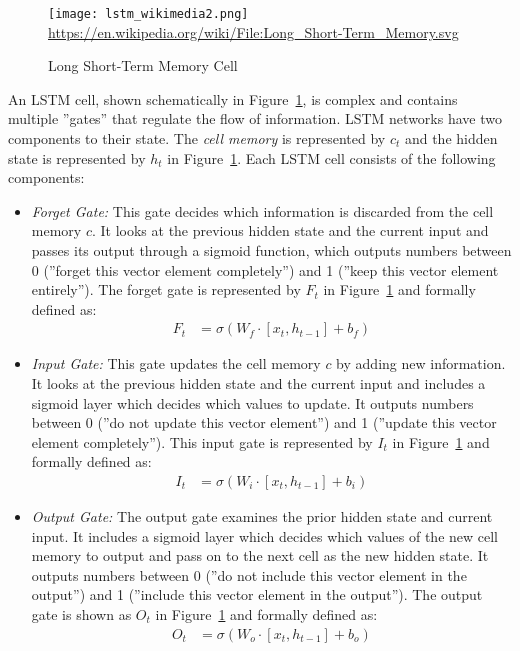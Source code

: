 \begin{figure}
\centering

\texttt{[image: lstm\_wikimedia2.png]}
\scriptsize \url{https://en.wikipedia.org/wiki/File:Long_Short-Term_Memory.svg} \normalsize
\caption{Long Short-Term Memory Cell}
\label{fig:lstm}
\end{figure}

An LSTM cell, shown schematically in Figure~\ref{fig:lstm}, is complex and contains multiple ''gates'' that regulate the flow of information. LSTM networks have two components to their state. The \emph{cell memory} is represented by $c_t$ and the hidden state is represented by $h_t$ in Figure~\ref{fig:lstm}. Each LSTM cell consists of the following components:

\begin{itemize}
\item \emph{Forget Gate:} This gate decides which information is discarded from the cell memory $c$. It looks at the previous hidden state and the current input and passes its output through a sigmoid function, which outputs numbers between 0 (''forget this vector element completely'') and 1 (''keep this vector element entirely''). The forget gate is represented by $F_t$ in Figure~\ref{fig:lstm} and formally defined as:
\begin{align}
F_t &= \sigma (W_f \cdot [ x_t, h_{t-1}] + b_f) \label{eq:forget}
\end{align}
\item \emph{Input Gate:} This gate updates the cell memory $c$ by adding new information. It looks at the previous hidden state and the current input and includes a sigmoid layer which decides which values to update. It outputs numbers between 0 (''do not update this vector element'') and 1 (''update this vector element completely''). This input gate is represented by $I_t$ in Figure~\ref{fig:lstm} and formally defined as:
\begin{align}
I_t &= \sigma (W_i \cdot [ x_t, h_{t-1}] + b_i) \label{eq:input}
\end{align}
\item \emph{Output Gate:} The output gate examines the prior hidden state and current input. It includes a sigmoid layer which decides which values of the new cell memory to output and pass on to the next cell as the new hidden state. It outputs numbers between 0 (''do not include this vector element in the output'') and 1 (''include this vector element in the output''). The output gate is shown as $O_t$ in Figure~\ref{fig:lstm} and formally defined as:
\begin{align}
O_t &= \sigma (W_o \cdot [ x_t, h_{t-1}] + b_o) \label{eq:output}
\end{align}
\end{itemize}


